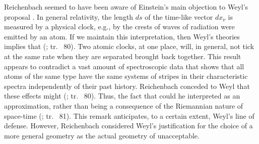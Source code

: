 \documentclass[draft]{article}
\newcommand{\rhp}[2]{(\cite[#1]{Reichenbach1920a}; tr.\ \citeyear{Reichenbach1969} #2)\xspace}
\begin{document}
Reichenbach seemed to have been aware of Einstein's main objection to Weyl's proposal \citep[see]{Einstein1918b}. In general relativity, the length $ds$ of the time-like vector $dx_\nu$ is measured by a physical clock, e.g., by the crests of waves of radiation were emitted by an atom. If we maintain this interpretation, then Weyl's theories implies that  \rhp{77}{80}. Two atomic clocks, at one place, will, in general, not tick at the same rate when they are separated brought back together. This result appears to contradict a vast amount of spectroscopic data that shows that all atoms of the same type have the same systems of stripes in their characteristic spectra independently of their past history. Reichenbach conceded to Weyl that these effects might  \rhp{77}{80}. Thus, the fact that  could he interpreted as an approximation, rather than being a consequence of the Riemannian nature of space-time \rhp{77}{81}. This remark anticipates, to a certain extent, Weyl's line of defense. However, Reichenbach considered Weyl's justification for the choice of a more general geometry as the actual geometry of \spti unacceptable.
\end{document}
